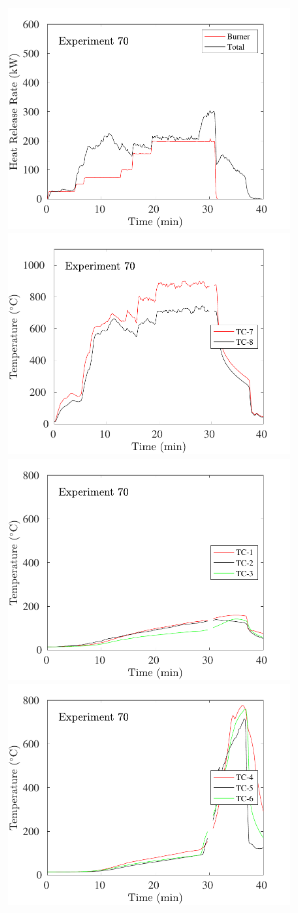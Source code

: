 \begin{figure}[H]
\includegraphics[height=2.30in]{../SCRIPT_FIGURES/Test_70_HRR} \hfill
\includegraphics[height=2.30in]{../SCRIPT_FIGURES/Test_70_TC_7-8} \\
\includegraphics[height=2.30in]{../SCRIPT_FIGURES/Test_70_TC_1-3} \hfill
\includegraphics[height=2.30in]{../SCRIPT_FIGURES/Test_70_TC_4-6}

\end{figure}
